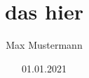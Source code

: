 \documentclass[paper=a4]{scrbook}
\begin{document}
\title{das hier }
\author{Max Mustermann}
\date{01.01.2021}
\maketitle
\end{document}
